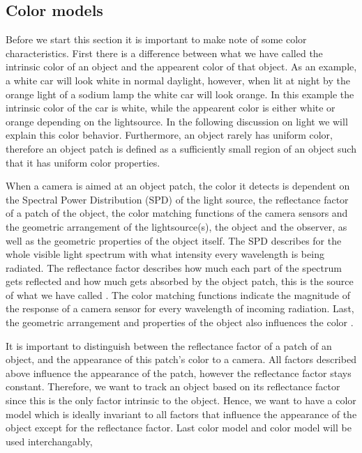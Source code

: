 \documentclass[a4paper,11pt]{article}
\begin{document}

\subsection{Color models}

Before we start this section it is important to make note of some color characteristics. First there is a difference between what we have called the intrinsic color of an object and the appearent color of that object. As an example, a white car will look white in normal daylight, however, when lit at night by the orange light of a sodium lamp the white car will look orange. In this example the intrinsic color of the car is white, while the appearent color is either white or orange depending on the lightsource. In the following discussion on light we will explain this color behavior. Furthermore, an object rarely has uniform color, therefore an object patch is defined as a sufficiently small region of an object such that it has uniform color properties.

When a camera is aimed at an object patch, the color it detects is dependent on the Spectral Power Distribution (SPD) of the light source, the reflectance factor of a patch of the object, the color matching functions of the camera sensors and the geometric arrangement of the lightsource(s), the object and the observer, as well as the geometric properties of the object itself. The SPD describes for the whole visible light spectrum with what intensity every wavelength is being radiated. The reflectance factor describes how much each part of the spectrum gets reflected and how much gets absorbed by the object patch, this is the source of what we have called . The color matching functions indicate the magnitude of the response of a camera sensor for every wavelength of incoming radiation. Last, the geometric arrangement and properties of the object also influences the color \cite{gevers_color}.

It is important to distinguish between the reflectance factor of a patch of an object, and the appearance of this patch's color to a camera. All factors described above influence the appearance of the patch, however the reflectance factor stays constant. Therefore, we want to track an object based on its reflectance factor since this is the only factor intrinsic to the object.  Hence, we want to have a color model which is ideally invariant to all factors that influence the appearance of the object except for the reflectance factor.  Last color model and color model will be used interchangably, 
\end{document}
